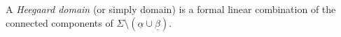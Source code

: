 

    A \emph{Heegaard domain} (or simply domain) is a formal linear combination of the connected components of $\Sigma\setminus (\underline \alpha\cup \underline \beta)$.
